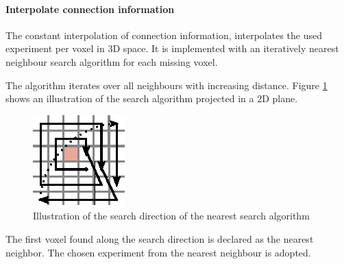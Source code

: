 \paragraph{Interpolate connection information}
\label{par:interpolation}
The constant interpolation of connection information, interpolates the used experiment per voxel in 3D space.
It is implemented with an iteratively nearest neighbour search algorithm for each missing voxel.

The algorithm iterates over all neighbours with increasing distance.
Figure \ref{longrange} shows an illustration of the search algorithm
projected in a 2D plane.
\begin{figure}[ht!]
\centering
\includegraphics[scale=2.5]{pictures/longRange_Nearest_parallelAlg.eps}
\caption{Illustration of the search direction of the nearest search algorithm}
\label{longrange}
\end{figure}
The first voxel found along the search direction is declared as the nearest neighbor.
The chosen experiment from the nearest neighbour is adopted.

